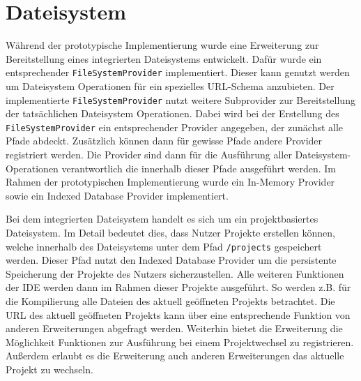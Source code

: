 \section{Dateisystem}\label{section:prototypische-implementierung:dateisystem}

Während der prototypische Implementierung wurde eine Erweiterung zur Bereitstellung eines integrierten Dateisystems entwickelt. Dafür wurde ein entsprechender \texttt{FileSystemProvider} implementiert. Dieser kann genutzt werden um Dateisystem Operationen für ein spezielles URL-Schema anzubieten. Der implementierte \texttt{FileSystemProvider} nutzt weitere Subprovider zur Bereitstellung der tatsächlichen Dateisystem Operationen. Dabei wird bei der Erstellung des \texttt{FileSystemProvider} ein entsprechender Provider angegeben, der zunächst alle Pfade abdeckt. Zusätzlich können dann für gewisse Pfade andere Provider registriert werden. Die Provider sind dann für die Ausführung aller Dateisystem-Operationen verantwortlich die innerhalb dieser Pfade ausgeführt werden. Im Rahmen der prototypischen Implementierung wurde ein In-Memory Provider sowie ein Indexed Database Provider implementiert.

Bei dem integrierten Dateisystem handelt es sich um ein projektbasiertes Dateisystem. Im Detail bedeutet dies, dass Nutzer Projekte erstellen können, welche innerhalb des Dateisystems unter dem Pfad \texttt{/projects} gespeichert werden. Dieser Pfad nutzt den Indexed Database Provider um die persistente Speicherung der Projekte des Nutzers sicherzustellen. Alle weiteren Funktionen der IDE werden dann im Rahmen dieser Projekte ausgeführt. So werden z.B. für die Kompilierung alle Dateien des aktuell geöffneten Projekts betrachtet. Die URL des aktuell geöffneten Projekts kann über eine entsprechende Funktion von anderen Erweiterungen abgefragt werden. Weiterhin bietet die Erweiterung die Möglichkeit Funktionen zur Ausführung bei einem Projektwechsel zu registrieren. Außerdem erlaubt es die Erweiterung auch anderen Erweiterungen das aktuelle Projekt zu wechseln.


